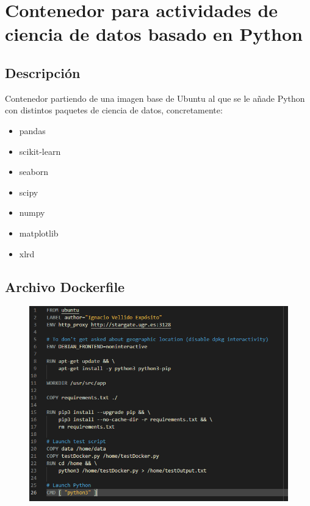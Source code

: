 \section{Contenedor para actividades de ciencia de datos basado en Python}

\subsection{Descripción}

Contenedor partiendo de una imagen base de Ubuntu al que se le añade Python con distintos paquetes de ciencia de datos, concretamente:
\begin{itemize}
    \item pandas
    \item scikit-learn
    \item seaborn
    \item scipy
    \item numpy
    \item matplotlib
    \item xlrd
\end{itemize}

\subsection{Archivo Dockerfile}

\begin{figure}[H]\center\includegraphics[width=.95\linewidth]{img/python/p0.png}\caption{}\end{figure}

